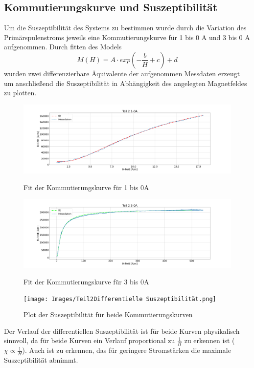     \subsection{Kommutierungskurve und Suszeptibilität}
        Um die Suszeptibilität des Systems zu bestimmen wurde durch die Variation des Primärspulenstroms jeweils eine Kommutierungskurve für 1 bis 0 A und 3 bis 0 A aufgenommen.
        Durch fitten des Models 
        \begin{equation}
            M(H) = A \cdot exp(-\frac{b}{H} + c) + d
        \end{equation}
        wurden zwei differenzierbare Äquivalente der aufgenommen Messdaten erzeugt um anschließend die Suszeptibilität in Abhängigkeit des angelegten Magnetfeldes zu plotten.
        \begin{figure}[H]
            \centering
            \includegraphics[width=\textwidth]{Images/Teil2Teil 2 1-0A.png}
            \label{Teil2-1A}
            \caption{Fit der Kommutierungskurve für 1 bis 0A}
        \end{figure}
        \begin{figure}[H]
            \centering
            \includegraphics[width=\textwidth]{Images/Teil2Teil 2 3-0A.png}
            \label{Teil2-3A}
            \caption{Fit der Kommutierungskurve für 3 bis 0A}
        \end{figure}
        \begin{figure}[H]
            \centering
            \texttt{[image: Images/Teil2Differentielle Suszeptibilität.png]}
            \label{DiffSus}
            \caption{Plot der Suszeptibilität für beide Kommutierungskurven}
        \end{figure}
            Der Verlauf der differentiellen Suszeptibilität ist für beide Kurven physikalisch sinnvoll, da für beide Kurven ein Verlauf proportional zu $\frac{1}{H}$ zu erkennen ist ($\chi \propto \frac{1}{H}$). Auch ist zu erkennen,
            das für geringere Stromstärken die maximale Suszeptibilität abnimmt.
